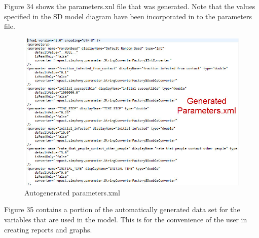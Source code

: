 \documentclass[11pt]{amsart}
\begin{document}
Figure 34 shows the parameters.xnl file that was generated. Note that the values specified in the SD model diagram have been incorporated in to the parameters file.


\begin{figure}[ht]
\begin{center}
\vspace{.2in}
\centerline {
\includegraphics[totalheight=0.4\textheight]{images/032.jpg}
}
\caption{Autogenerated parameters.xml}
\label{fig:032}
\end{center}
\end{figure}

Figure 35 contains a portion of the automatically generated data set for the variables that are used in the model. This is for the convenience of the user in creating reports and graphs. 

\clearpage
\end{document}

